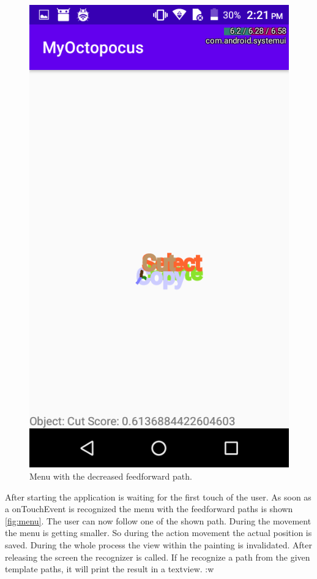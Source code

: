\documentclass[11pt,twocolumn]{scrartcl}
\begin{document}
\begin{figure}[!h]
		\label{fig:menu2}
	\begin{center}
		\includegraphics[scale=0.3]{./img/myoctopocus2.png}
		\caption{Menu with the decreased feedforward path.}
	\end{center}
\end{figure}

After starting the application is waiting for the first touch of the user. As soon as a onTouchEvent is recognized the menu with the feedforward paths is shown \ref{fig:menu}. The user can now follow one of the shown path. During the movement the menu is getting smaller. So during the action movement the actual position is saved. During the whole process the view within the painting is invalidated.  After releasing the screen the recognizer is called. If he recognize a path from the given template paths, it will print the result in a textview.
:w


\printbibliography
\end{document}
